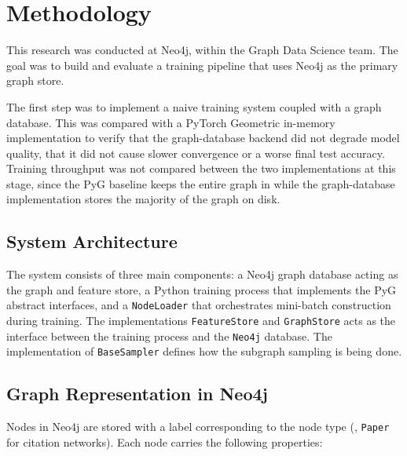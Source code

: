 \chapter{Methodology}\label{ch:methodology}

This research was conducted at Neo4j, within the Graph Data Science team. The goal
was to build and evaluate a  training pipeline that uses Neo4j as the
primary graph store.

The first step was to implement a naive  training system coupled with a
graph database. This was compared with a PyTorch Geometric in-memory implementation
to verify that the graph-database backend did not degrade model quality, \ie that it
did not cause slower convergence or a worse final test accuracy. Training throughput
was not compared between the two implementations at this stage, since the PyG baseline
keeps the entire graph in  while the graph-database implementation stores
the majority of the graph on disk.


\section{System Architecture}\label{sec:sys_arch}

The system consists of three main components: a Neo4j graph database acting as the
graph and feature store, a Python training process that implements the PyG abstract
interfaces, and a \texttt{NodeLoader} that orchestrates mini-batch construction during
training. The implementations \texttt{FeatureStore} and \texttt{GraphStore} acts as the interface
between the training process and the \texttt{Neo4j} database. The implementation of \texttt{BaseSampler}
defines how the subgraph sampling is being done.


\section{Graph Representation in Neo4j}\label{sec:graph_repr}

Nodes in Neo4j are stored with a label corresponding to the node type (\eg,
\texttt{Paper} for citation networks). Each node carries the following properties:

